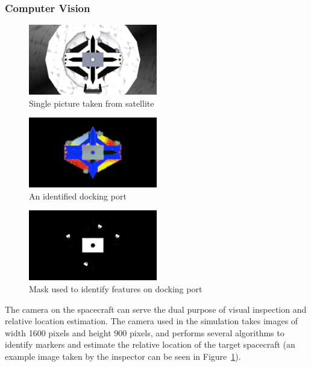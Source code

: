 \documentclass[journal, 10pt]{IEEEtran}
\begin{document}
\subsubsection{Computer Vision} \label{cv}
\begin{figure}[tbh]
\begin{center}
\includegraphics[width=0.5\textwidth]{figures/DockingPort.pdf}
\caption{Single picture taken from satellite}
\label{docking_port}
\end{center}
\end{figure}

\begin{figure}[tbh]
\begin{center}
\includegraphics[width=0.5\textwidth]{figures/DockingPortSubtraction.pdf}
\caption{An identified docking port}
\label{docking_port_subtraction}
\end{center}
\end{figure}

\begin{figure}[tbh]
\begin{center}
\includegraphics[width=0.5\textwidth]{figures/DockingPortFeatures.pdf}
\caption{Mask used to identify features on docking port}
\label{docking_port_features}
\end{center}
\end{figure}

The camera on the spacecraft can serve the dual purpose of visual inspection and relative location estimation. The camera used in the simulation takes images of width 1600 pixels and height 900 pixels, and performs several algorithms to identify markers and estimate the relative location of the target spacecraft (an example image taken by the inspector can be seen in Figure~\ref{docking_port}).
\end{document}
